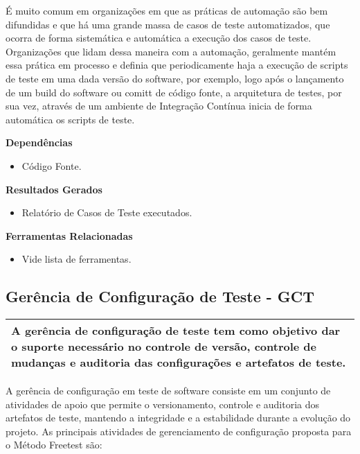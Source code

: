 É muito comum em organizações em que as práticas de automação são bem difundidas e que há uma grande massa de casos de teste automatizados, que ocorra de forma sistemática e automática a execução dos casos de teste. Organizações que lidam dessa maneira com a automação, geralmente mantém essa prática em processo e definia que periodicamente haja a execução de scripts de teste em uma dada versão do software, por exemplo, logo após o lançamento de um build do software ou comitt de código fonte, a arquitetura de testes, por sua vez, através de um ambiente de Integração Contínua inicia de forma automática os scripts de teste.

\textbf{Dependências}
\begin{itemize}
    \item Código Fonte.
\end{itemize}

\textbf{Resultados Gerados }
\begin{itemize}
    \item Relatório de Casos de Teste executados.
\end{itemize}

\textbf{Ferramentas Relacionadas }
\begin{itemize}
    \item Vide lista de ferramentas.
\end{itemize}


\subsection{ Gerência de Configuração de Teste - GCT }
\label{sec:gct}

\begin{table}[!ht]
\centering
\begin{tabular}{|p{130mm}|}
\hline
A gerência de configuração de teste tem como objetivo dar o suporte necessário no controle de versão, controle de mudanças e auditoria das configurações e artefatos de teste. \\ 
\hline
\end{tabular}
\end{table}

A gerência de configuração em teste de software consiste em um conjunto de atividades de apoio que permite o versionamento, controle e auditoria dos artefatos de teste, mantendo a integridade e a estabilidade durante a evolução do projeto. As principais atividades de gerenciamento de configuração proposta para o Método Freetest são:


